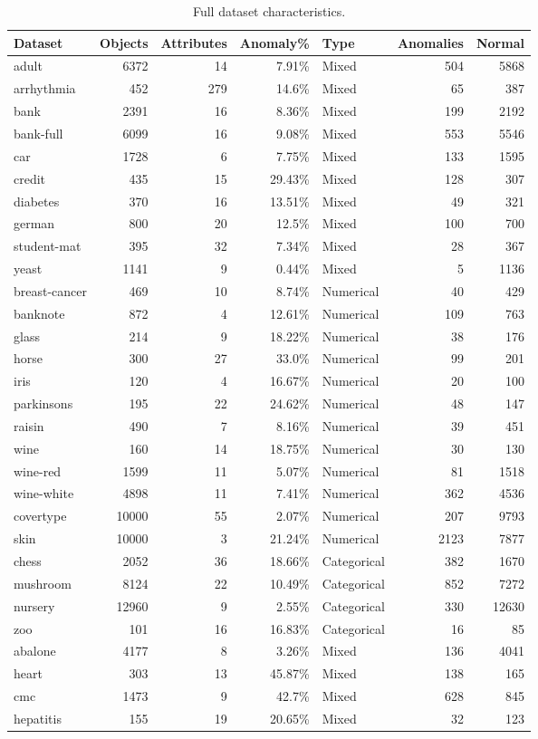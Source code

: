 \documentclass[11pt,a4paper]{article}
\begin{document}
\begin{table}[H]\centering\caption{Full dataset characteristics.}\label{tab:ds}\small
\begin{tabular}{lrrrlrr}
\toprule
Dataset & Objects & Attributes & Anomaly\% & Type & Anomalies & Normal \\
\midrule
adult & 6372 & 14 & 7.91\% & Mixed & 504 & 5868 \\
arrhythmia & 452 & 279 & 14.6\% & Mixed & 65 & 387 \\
bank & 2391 & 16 & 8.36\% & Mixed & 199 & 2192 \\
bank-full & 6099 & 16 & 9.08\% & Mixed & 553 & 5546 \\
car & 1728 & 6 & 7.75\% & Mixed & 133 & 1595 \\
credit & 435 & 15 & 29.43\% & Mixed & 128 & 307 \\
diabetes & 370 & 16 & 13.51\% & Mixed & 49 & 321 \\
german & 800 & 20 & 12.5\% & Mixed & 100 & 700 \\
student-mat & 395 & 32 & 7.34\% & Mixed & 28 & 367 \\
yeast & 1141 & 9 & 0.44\% & Mixed & 5 & 1136 \\
breast-cancer & 469 & 10 & 8.74\% & Numerical & 40 & 429 \\
banknote & 872 & 4 & 12.61\% & Numerical & 109 & 763 \\
glass & 214 & 9 & 18.22\% & Numerical & 38 & 176 \\
horse & 300 & 27 & 33.0\% & Numerical & 99 & 201 \\
iris & 120 & 4 & 16.67\% & Numerical & 20 & 100 \\
parkinsons & 195 & 22 & 24.62\% & Numerical & 48 & 147 \\
raisin & 490 & 7 & 8.16\% & Numerical & 39 & 451 \\
wine & 160 & 14 & 18.75\% & Numerical & 30 & 130 \\
wine-red & 1599 & 11 & 5.07\% & Numerical & 81 & 1518 \\
wine-white & 4898 & 11 & 7.41\% & Numerical & 362 & 4536 \\
covertype & 10000 & 55 & 2.07\% & Numerical & 207 & 9793 \\
skin & 10000 & 3 & 21.24\% & Numerical & 2123 & 7877 \\
chess & 2052 & 36 & 18.66\% & Categorical & 382 & 1670 \\
mushroom & 8124 & 22 & 10.49\% & Categorical & 852 & 7272 \\
nursery & 12960 & 9 & 2.55\% & Categorical & 330 & 12630 \\
zoo & 101 & 16 & 16.83\% & Categorical & 16 & 85 \\
abalone & 4177 & 8 & 3.26\% & Mixed & 136 & 4041 \\
heart & 303 & 13 & 45.87\% & Mixed & 138 & 165 \\
cmc & 1473 & 9 & 42.7\% & Mixed & 628 & 845 \\
hepatitis & 155 & 19 & 20.65\% & Mixed & 32 & 123 \\
\bottomrule\end{tabular}\end{table}
\end{document}

